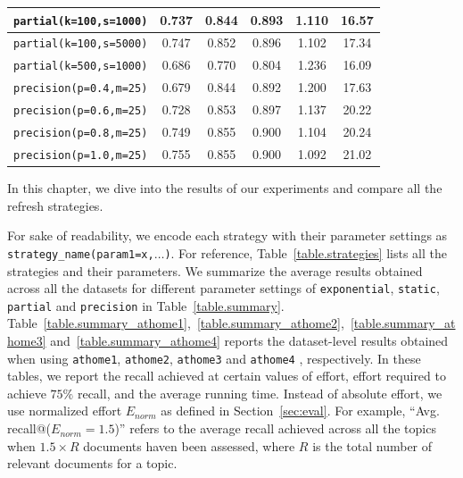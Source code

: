 \begin{table}[]
{\begin{tabular}{|c|c|c|c|c|c|}
\texttt{partial(k=100,s=1000)} & 0.737 & 0.844 & 0.893 & 1.110 & 16.57 \\ \hline
\texttt{partial(k=100,s=5000)} & 0.747 & 0.852 & 0.896 & 1.102 & 17.34 \\ \hline
\texttt{partial(k=500,s=1000)} & 0.686 & 0.770 & 0.804 & 1.236 & 16.09 \\ \hline
\hline
\texttt{precision(p=0.4,m=25)} & 0.679 & 0.844 & 0.892 & 1.200 & 17.63 \\ \hline
\texttt{precision(p=0.6,m=25)} & 0.728 & 0.853 & 0.897 & 1.137 & 20.22 \\ \hline
\texttt{precision(p=0.8,m=25)} & 0.749 & 0.855 & 0.900 & 1.104 & 20.24 \\ \hline
\texttt{precision(p=1.0,m=25)} & 0.755 & 0.855 & 0.900 & 1.092 & 21.02 \\ \hline
\end{tabular}
}
\end{table}
In this chapter, we dive into the results of our experiments and compare
all the refresh strategies.

For sake of readability, we encode each strategy with their parameter
settings as \texttt{strategy\_name(param1=x,$\ldots$)}. For reference, Table~\ref{table.strategies}
lists all the strategies and their parameters.
We summarize the average results obtained across all the datasets for different
parameter settings of \texttt{exponential}, \texttt{static},
\texttt{partial} and \texttt{precision} in Table~\ref{table.summary}.
Table~\ref{table.summary_athome1},~\ref{table.summary_athome2},~\ref{table.summary_athome3}
and~\ref{table.summary_athome4} reports the dataset-level results obtained when
using \texttt{athome1}, \texttt{athome2}, \texttt{athome3} and \texttt{athome4}
, respectively.
In these tables, we report the recall achieved at certain values of effort, effort required to
achieve $75\%$ recall, and the average running time. Instead of absolute effort,
we use normalized effort $E_{norm}$ as defined in Section~\ref{sec:eval}. For
example, ``Avg. recall@($E_{norm}=1.5$)'' refers to the average recall achieved
across all the topics when $1.5 \times R$ documents haven been assessed, where $R$
is the total number of relevant documents for a topic.

